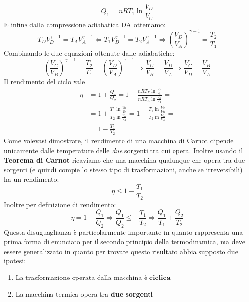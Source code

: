 \documentclass{article}
\newcommand{\then}{\ensuremath{\Rightarrow}}
\begin{document}
\[Q_1=nRT_1\ln\frac{V_D}{V_C}\]
E infine dalla compressione adiabatica DA otteniamo:
\[T_DV_D^{\gamma-1}=T_AV_A^{\gamma-1}\iff T_1V_D^{\gamma-1}=T_2V_A^{\gamma-1}\then \left(\frac{V_D}{V_A}\right)^{\gamma-1}=\frac{T_2}{T_1}\]
Combinando le due equazioni ottenute dalle adiabatiche:
\[\left(\frac{V_C}{V_B}\right)^{\gamma-1}=\frac{T_2}{T_1}=\left(\frac{V_D}{V_A}\right)^{\gamma-1}\then \frac{V_C}{V_B}=\frac{V_D}{V_A}\then\boxed{\frac{V_C}{V_D}=\frac{V_B}{V_A}}\]
Il rendimento del ciclo vale 
\begin{equation}
\begin{split}
    \eta&=1+\frac{Q_1}{Q_2}=1+\frac{nRT_B\ln\frac{V_D}{V_C}}{nRT_A\ln\frac{V_B}{V_A}}=\\
    &=1+\frac{T_1\ln\frac{V_D}{V_C}}{T_2\ln\frac{V_B}{V_A}}=1-\frac{T_1\ln\frac{V_C}{V_D}}{T_2\ln\frac{V_B}{V_A}}=\\
    &=\boxed{1-\frac{T_1}{T_2}}
\end{split}
\end{equation}
Come volevasi dimostrare, il rendimento di una macchina di Carnot dipende unicamente dalle temperature delle \textit{due} sorgenti tra cui opera. Inoltre usando il \textbf{Teorema di Carnot} ricaviamo che una macchina qualunque che opera tra due sorgenti (e quindi compie lo stesso tipo di trasformazioni, anche se irreversibili) ha un rendimento:
\[\eta\leq1-\frac{T_1}{T_2}\]
Inoltre per definizione di rendimento:
\[\eta=1+\frac{Q_1}{Q_2}\then \frac{Q_1}{Q_2}\leq -\frac{T_1}{T_2}\then \boxed{\frac{Q_1}{T_1}+\frac{Q_2}{T_2}}\]
Questa disuguaglianza è particolarmente importante in quanto rappresenta una prima forma di enunciato per il secondo principio della termodinamica, ma deve essere generalizzato in quanto per trovare questo risultato abbia supposto due ipotesi:
\begin{enumerate}
    \item La trasformazione operata dalla macchina è \textbf{ciclica}
    \item La macchina termica opera tra \textbf{due sorgenti}
\end{enumerate}
\end{document}
